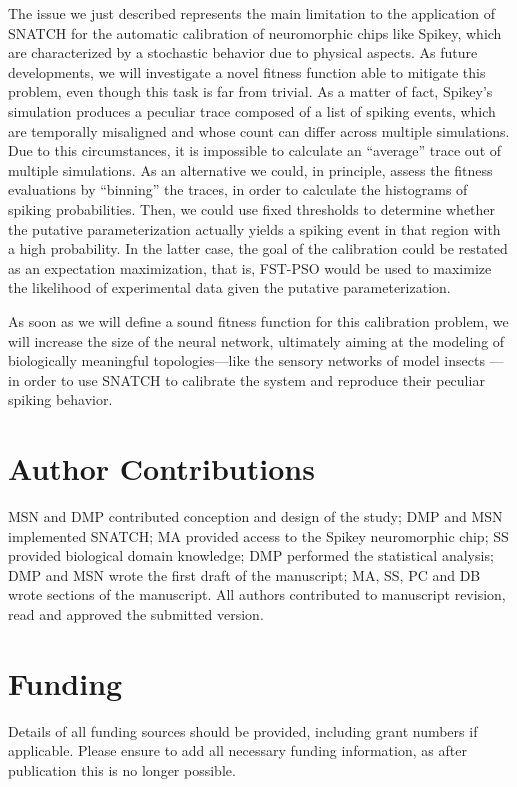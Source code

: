 \documentclass[utf8]{frontiersFPHY} %
\newcommand {\name}{SNATCH}
\begin{document}
The issue we just described represents the main limitation to the application of \name{} for the automatic calibration of neuromorphic chips like Spikey, which are  characterized by a stochastic behavior due to physical aspects. 
As future developments, we will investigate a novel fitness function able to mitigate this problem, even though this task is far from trivial.
As a matter of fact, Spikey's simulation produces a peculiar trace composed of a list of spiking events, which are temporally misaligned and whose count can differ across multiple simulations. 
Due to this circumstances, it is impossible to calculate an ``average'' trace out of multiple simulations.
As an alternative we could, in principle, assess the fitness evaluations by ``binning'' the traces, in order to calculate the histograms of spiking probabilities.
Then, we could use fixed thresholds to determine whether the putative parameterization actually yields a spiking event in that region with a high probability. 
In the latter case, the goal of the calibration could be restated as an expectation maximization, that is, FST-PSO would be used to maximize the likelihood of experimental data given the putative parameterization.

As soon as we will define a sound fitness function for this calibration problem, we will increase the size of the neural network, ultimately aiming at the modeling of biologically meaningful topologies---like the sensory networks of model insects  \cite{namiki2009reconstruction,Pfeil2013}---in order to use \name{} to calibrate the system and reproduce their peculiar spiking behavior.

\section*{Author Contributions}
MSN and DMP contributed conception and design of the study; DMP and MSN implemented SNATCH; MA provided access to the Spikey neuromorphic chip; SS provided biological domain knowledge; DMP performed the statistical analysis; DMP and MSN wrote the first draft of the manuscript; MA, SS, PC and DB wrote sections of the manuscript. All authors contributed to manuscript revision, read and approved the submitted version.

\section*{Funding}
Details of all funding sources should be provided, including grant numbers if applicable. Please ensure to add all necessary funding information, as after publication this is no longer possible.
\end{document}
